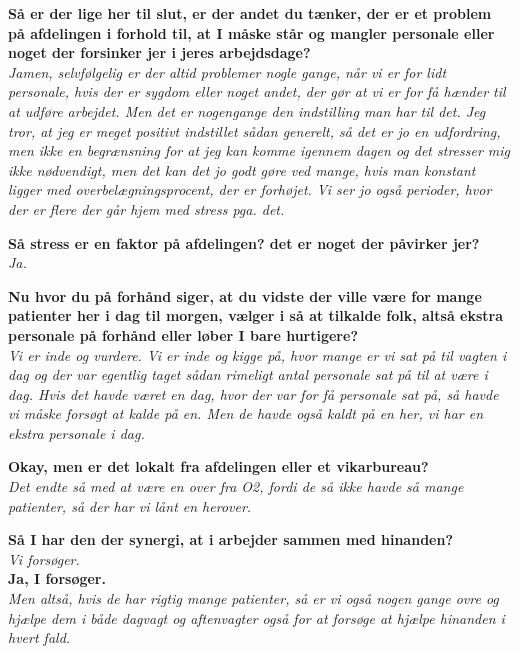 \textbf{Så er der lige her til slut, er der andet du tænker, der er et problem på afdelingen i forhold til, at I måske står og mangler personale eller noget der forsinker jer i jeres arbejdsdage?} \\
\noindent
\textit{Jamen, selvfølgelig er der altid problemer nogle gange, når vi er for lidt personale, hvis der er sygdom eller noget andet, der gør at vi er for få hænder til at udføre arbejdet. Men det er nogengange den indstilling man har til det. Jeg tror, at jeg er meget positivt indstillet sådan generelt, så det er jo en udfordring, men ikke en begrænsning for at jeg kan komme igennem dagen og det stresser mig ikke nødvendigt, men det kan det jo godt gøre ved mange, hvis man konstant ligger med overbelægningsprocent, der er forhøjet. Vi ser jo også perioder, hvor der er flere der går hjem med stress pga. det. } \\ \noindent

\textbf{Så stress er en faktor på afdelingen? det er noget der påvirker jer?} \\
\noindent
\textit{ Ja.} \\
\noindent


\textbf{Nu hvor du på forhånd siger, at du vidste der ville være for mange patienter her i dag til morgen, vælger i så at tilkalde folk, altså ekstra personale på forhånd eller løber I bare hurtigere? } \\
\noindent
\textit{Vi er inde og vurdere. Vi er inde og kigge på, hvor mange er vi sat på til vagten i dag og der var egentlig taget sådan rimeligt antal personale sat på til at være i dag.
Hvis det havde været en dag, hvor der var for få personale sat på, så havde vi måske forsøgt at kalde på en. Men de havde også kaldt på en her, vi har en ekstra personale i dag.} \\
\noindent


\textbf{Okay, men er det lokalt fra afdelingen eller et vikarbureau? } \\
\noindent
\textit{ Det endte så med at være en over fra O2, fordi de så ikke havde så mange patienter, så der har vi lånt en herover. } \\
\noindent


\textbf{Så I har den der synergi, at i arbejder sammen med hinanden?} \\
\noindent
\textit{Vi forsøger.} \\
\noindent
\textbf{Ja, I forsøger.} \\
\noindent
\textit{Men altså, hvis de har rigtig mange patienter, så er vi også nogen gange ovre og hjælpe dem i både dagvagt og aftenvagter også for at forsøge at hjælpe hinanden i hvert fald.} \\
\noindent

